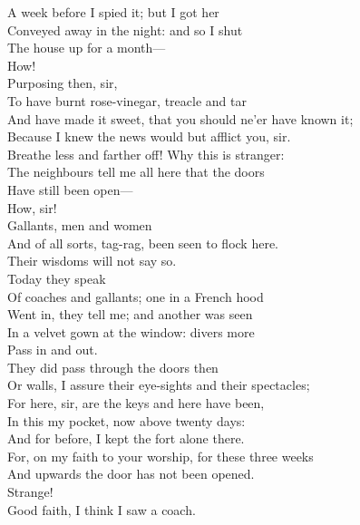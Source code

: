 \documentclass[a4paper,oneside,12pt]{memoir}
\begin{document}
\begin{drama*}
A week before I spied it; but I got her\\
Conveyed away in the night: and so I shut\\
The house up for a month---\\
\lovewitspeaks {} How!\\
\facespeaks {} Purposing then, sir,\\
To have burnt rose-vinegar, treacle and tar\\
And have made it sweet, that you should ne'er have known it;\\
Because I knew the news would but afflict you, sir.\\
\lovewitspeaks Breathe less and farther off! Why this is stranger:\\
The neighbours tell me all here that the doors\\
Have still been open---\\
\facespeaks {} How, sir!\\
\lovewitspeaks {} Gallants, men and women\\
And of all sorts, tag-rag, been seen to flock here.\\
\facespeaks Their wisdoms will not say so.\\
\lovewitspeaks {} Today they speak\\
Of coaches and gallants; one in a French hood\\
Went in, they tell me; and another was seen\\
In a velvet gown at the window: divers more\\
Pass in and out.\\
\facespeaks {} They did pass through the doors then\\
Or walls, I assure their eye-sights and their spectacles;\\
For here, sir, are the keys and here have been,\\
In this my pocket, now above twenty days:\\
And for before, I kept the fort alone there.\\
For, on my faith to your worship, for these three weeks\\
And upwards the door has not been opened.\\
\lovewitspeaks Strange!\\
\neighonespeaks {} Good faith, I think I saw a coach.\\

\end{drama*}
\end{document}
